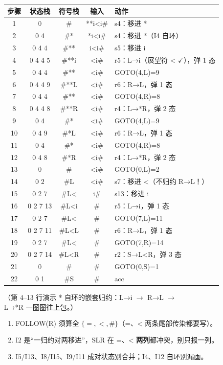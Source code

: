 \documentclass[12pt,a4paper,fontset=windows]{ctexart}
\newcommand{\ok}{\ensuremath{\checkmark}}
\begin{document}
\begin{center}
\renewcommand{\arraystretch}{1.25}
\begin{tabular}{c c c c p{5.8cm}}
\toprule
\textbf{步骤} & \textbf{状态栈} & \textbf{符号栈} & \textbf{输入} & \textbf{动作} \\
\midrule
1 & 0 & \# & {*}{*}i<i\# & s4：移进 {*} \\
2 & 0 4 & \#{*} & {*}i<i\# & s4：移进 {*}（I4 自环） \\
3 & 0 4 4 & \#{*}{*} & i<i\# & s5：移进 i \\
4 & 0 4 4 5 & \#{*}{*}i & <i\# & r5：L→i（展望符 < \ok），弹 1 态 \\
5 & 0 4 4 & \#{*}{*} & <i\# & GOTO(4,L)=9 \\
6 & 0 4 4 9 & \#{*}{*}L & <i\# & r6：R→L，弹 1 态 \\
7 & 0 4 4 & \#{*}{*} & <i\# & GOTO(4,R)=8 \\
8 & 0 4 4 8 & \#{*}{*}R & <i\# & r4：L→{*}R，弹 2 态 \\
9 & 0 4 & \#{*} & <i\# & GOTO(4,L)=9 \\
10 & 0 4 9 & \#{*}L & <i\# & r6：R→L，弹 1 态 \\
11 & 0 4 & \#{*} & <i\# & GOTO(4,R)=8 \\
12 & 0 4 8 & \#{*}R & <i\# & r4：L→{*}R，弹 2 态 \\
13 & 0 & \# & <i\# & GOTO(0,L)=2 \\
14 & 0 2 & \#L & <i\# & s7：移进 <（不归约 R→L！） \\
15 & 0 2 7 & \#L< & i\# & s13：移进 i \\
16 & 0 2 7 13 & \#L<i & \# & r5：L→i，弹 1 态 \\
17 & 0 2 7 & \#L< & \# & GOTO(7,L)=11 \\
18 & 0 2 7 11 & \#L<L & \# & r6：R→L，弹 1 态 \\
19 & 0 2 7 & \#L< & \# & GOTO(7,R)=14 \\
20 & 0 2 7 14 & \#L<R & \# & r2：S→L<R，弹 3 态 \\
21 & 0 & \# & \# & GOTO(0,S)=1 \\
22 & 0 1 & \#S & \# & acc \\
\bottomrule
\end{tabular}
\end{center}

（第 4--13 行演示 {*} 自环的嵌套归约：L→i $\to$ R→L $\to$ L→{*}R 一圈圈往上包。）

\begin{warnbox}[易错]
\begin{enumerate}
\item FOLLOW(R) 须算全 $\{=,<,\#\}$（=、< 两条尾部传染都要写）。
\item I2 是``一归约对两移进''，SLR 在 =、< \textbf{两列}都冲突，别只报一列。
\item I5/I13、I8/I15、I9/I11 成对状态别合并；I4、I12 自环别漏画。
\end{enumerate}
\end{warnbox}
\end{document}
